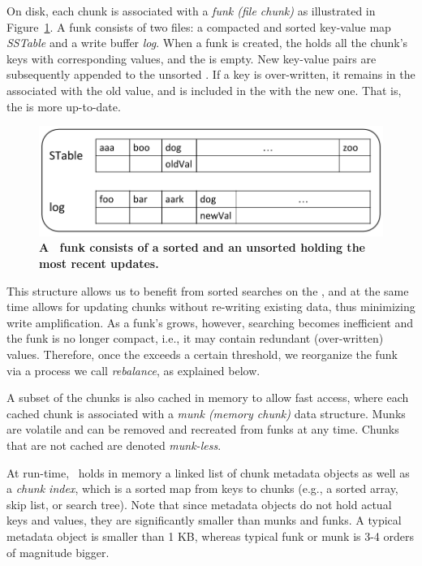 On disk, each chunk is associated with a  \emph{funk (file chunk)} as illustrated in 
Figure~\ref{fig:funk}. A funk
consists of two files:   
a compacted and sorted  key-value map \emph{SSTable} and a write buffer \emph{log}. When a funk is created, the  holds all the chunk's keys with corresponding values, and the   is empty.
New key-value pairs are subsequently appended to the unsorted . If a key is over-written, it remains in the  associated with the old value, and is included in the  with the new one.
That is, the  is more up-to-date.

\begin{figure}[tb]
\centerline{
\includegraphics[width=\columnwidth]{funk.png}
}
\caption{\bf{A \sys\ funk consists of a sorted  and an unsorted  holding the most recent updates.}}
\label{fig:funk}
\end{figure}

This structure allows us to benefit from sorted searches on the , and at the same time
allows for updating chunks without re-writing existing data, thus minimizing write amplification.
As a funk's   grows, however, searching becomes inefficient   and  
the funk is no longer compact, i.e., it may contain redundant (over-written) values.
Therefore, once the   exceeds a certain threshold, we reorganize the funk
via a process we call \emph{rebalance}, as explained below.

A subset of the chunks is also cached in memory to allow fast access, where each cached chunk is associated with a
\emph{munk (memory chunk)}  data structure. 
Munks are volatile and can be removed and recreated from funks at any time.
Chunks that are not cached are denoted \emph{munk-less}.

At run-time, \sys\ holds in memory a linked list of chunk metadata objects as well as 
a \emph{chunk index}, which is a sorted map from keys to chunks (e.g., a sorted array, skip list, or search tree).
Note that since metadata objects do not hold actual keys and values, they are significantly smaller than munks and funks. 
A typical metadata object is smaller than 1 KB, whereas typical funk or munk 
is 3-4 orders of magnitude bigger. 

